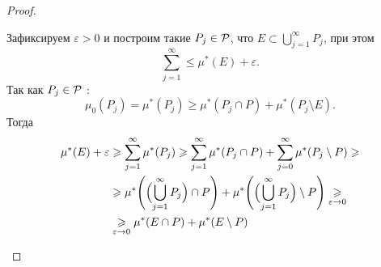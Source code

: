 \begin{proof}
\begin{description}
			Зафиксируем $ \varepsilon >0$ и построим такие $ P_j \in \P$, что $ E \subset \bigcup\limits_{j=1}^{\infty} P_j$, при этом
			\[
			\sum_{j=1}^{\infty} \le \mu^*( E )+\varepsilon 
			.\] 
			Так как $ P_j \in \P$ :
			\[
				\mu_0(P_j) = \mu^*( P_j ) \ge \mu^*( P_j \cap P ) + \mu^*( P_j \setminus E )
			.\] 
			Тогда
			\[
			\begin{aligned}
				\mu^*( E )  + \varepsilon  &\ge  \sum_{j=1}^{\infty} \mu^*( P_j )  \ge \sum_{j=1}^{\infty} \mu^*( P_j \cap P )  + \sum_{j=0}^{\infty} \mu^*( P_j \setminus P )  \ge \\
										   & \ge \mu^*\Biggl( \Bigl(\bigcup_{j=1}^{\infty} P_j \Bigr) \cap P\Biggr) + \mu^*\Biggl( \Bigl(  \bigcup_{j=1}^{\infty} P_j\Bigr)\setminus P\Biggr) \underset{\varepsilon  \to  0}{\ge} \\
										   &\underset{\varepsilon \to  0}{\ge} \mu^*( E \cap P ) + \mu^*( E \setminus P )
			\end{aligned}
			\]
	\end{description} 
\end{proof}

